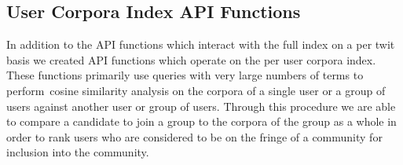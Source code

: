 \subsection{User Corpora Index API Functions}
In addition to the API functions which interact with the full index on a per twit basis we created API functions which operate on the per user corpora index.  These functions primarily use queries with very large numbers of terms to perform cosine similarity analysis on the corpora of a single user or a group of users against another user or group of users.  Through this procedure we are able to compare a candidate to join a group to the corpora of the group as a whole in order to rank users who are considered to be on the fringe of a community for inclusion into the community.

